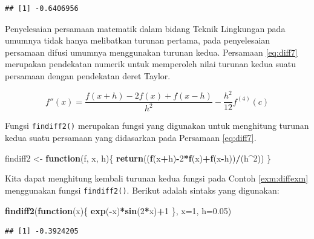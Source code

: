 \documentclass[]{book}
\newenvironment{Shaded}{\begin{snugshade}}{\end{snugshade}}
\newcommand{\ControlFlowTok}[1]{\textcolor[rgb]{0.13,0.29,0.53}{\textbf{#1}}}
\newcommand{\DataTypeTok}[1]{\textcolor[rgb]{0.13,0.29,0.53}{#1}}
\newcommand{\DecValTok}[1]{\textcolor[rgb]{0.00,0.00,0.81}{#1}}
\newcommand{\FloatTok}[1]{\textcolor[rgb]{0.00,0.00,0.81}{#1}}
\newcommand{\KeywordTok}[1]{\textcolor[rgb]{0.13,0.29,0.53}{\textbf{#1}}}
\newcommand{\NormalTok}[1]{#1}
\newcommand{\OperatorTok}[1]{\textcolor[rgb]{0.81,0.36,0.00}{\textbf{#1}}}
\newcommand{\StringTok}[1]{\textcolor[rgb]{0.31,0.60,0.02}{#1}}
\theoremstyle{definition}
\theoremstyle{definition}
\theoremstyle{definition}
\theoremstyle{remark}
\begin{document}
\begin{verbatim}
## [1] -0.6406956
\end{verbatim}

Penyelesaian persamaan matematik dalam bidang Teknik Lingkungan pada umumnya tidak hanya melibatkan turunan pertama, pada penyelesaian persamaan difusi umumnya menggunakan turunan kedua. Persamaan \eqref{eq:diff7} merupakan pendekatan numerik untuk memperoleh nilai turunan kedua suatu persamaan dengan pendekatan deret Taylor.

\begin{equation}
f''\left(x\right)=\frac{f\left(x+h\right)-2f\left(x\right)+f\left(x-h\right)}{h^2}-\frac{h^2}{12}f^{\left(4\right)}\left(c\right)
  \label{eq:diff7}
\end{equation}

Fungsi \texttt{findiff2()} merupakan fungsi yang digunakan untuk menghitung turunan kedua suatu persamaan yang didasarkan pada Persamaan \eqref{eq:diff7}.

\begin{Shaded}
\begin{Highlighting}[]
\NormalTok{findiff2 <-}\StringTok{ }\ControlFlowTok{function}\NormalTok{(f, x, h)\{}
  \KeywordTok{return}\NormalTok{((}\KeywordTok{f}\NormalTok{(x}\OperatorTok{+}\NormalTok{h)}\OperatorTok{-}\DecValTok{2}\OperatorTok{*}\KeywordTok{f}\NormalTok{(x)}\OperatorTok{+}\KeywordTok{f}\NormalTok{(x}\OperatorTok{-}\NormalTok{h))}\OperatorTok{/}\NormalTok{(h}\OperatorTok{^}\DecValTok{2}\NormalTok{))}
\NormalTok{\}}
\end{Highlighting}
\end{Shaded}

Kita dapat menghitung kembali turunan kedua fungsi pada Contoh \ref{exm:diffexm} menggunakan fungsi \texttt{findiff2()}. Berikut adalah sintaks yang digunakan:

\begin{Shaded}
\begin{Highlighting}[]
\KeywordTok{findiff2}\NormalTok{(}\ControlFlowTok{function}\NormalTok{(x)\{}
  \KeywordTok{exp}\NormalTok{(}\OperatorTok{-}\NormalTok{x)}\OperatorTok{*}\KeywordTok{sin}\NormalTok{(}\DecValTok{2}\OperatorTok{*}\NormalTok{x)}\OperatorTok{+}\DecValTok{1}
\NormalTok{\}, }\DataTypeTok{x=}\DecValTok{1}\NormalTok{, }\DataTypeTok{h=}\FloatTok{0.05}\NormalTok{)}
\end{Highlighting}
\end{Shaded}

\begin{verbatim}
## [1] -0.3924205
\end{verbatim}
\end{document}
